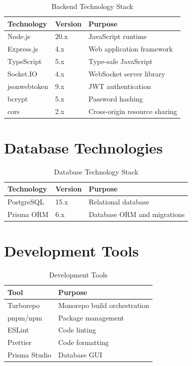 \documentclass[12pt,a4paper]{report}
\begin{document}
\begin{table}[H]
\centering
\begin{tabularx}{\textwidth}{|l|l|X|}
\hline
\textbf{Technology} & \textbf{Version} & \textbf{Purpose} \\
\hline
Node.js & 20.x & JavaScript runtime \\
\hline
Express.js & 4.x & Web application framework \\
\hline
TypeScript & 5.x & Type-safe JavaScript \\
\hline
Socket.IO & 4.x & WebSocket server library \\
\hline
jsonwebtoken & 9.x & JWT authentication \\
\hline
bcrypt & 5.x & Password hashing \\
\hline
cors & 2.x & Cross-origin resource sharing \\
\hline
\end{tabularx}
\caption{Backend Technology Stack}
\end{table}

\section{Database Technologies}

\begin{table}[H]
\centering
\begin{tabularx}{\textwidth}{|l|l|X|}
\hline
\textbf{Technology} & \textbf{Version} & \textbf{Purpose} \\
\hline
PostgreSQL & 15.x & Relational database \\
\hline
Prisma ORM & 6.x & Database ORM and migrations \\
\hline
\end{tabularx}
\caption{Database Technology Stack}
\end{table}

\section{Development Tools}

\begin{table}[H]
\centering
\begin{tabularx}{\textwidth}{|l|X|}
\hline
\textbf{Tool} & \textbf{Purpose} \\
\hline
Turborepo & Monorepo build orchestration \\
\hline
pnpm/npm & Package management \\
\hline
ESLint & Code linting \\
\hline
Prettier & Code formatting \\
\hline
Prisma Studio & Database GUI \\
\hline
\end{tabularx}
\caption{Development Tools}
\end{table}
\end{document}
